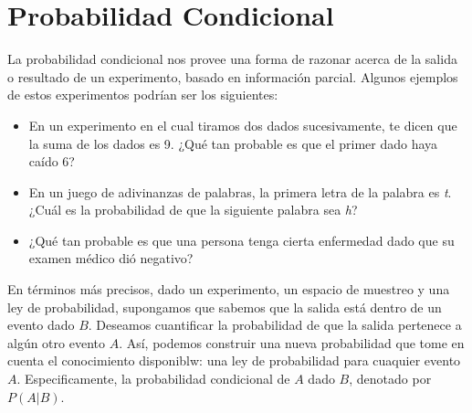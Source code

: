 
\section{Probabilidad Condicional}

La probabilidad condicional nos provee una forma de razonar acerca de la salida
o resultado de un experimento, basado en información parcial. Algunos ejemplos
de estos experimentos podrían ser los siguientes:

\begin{itemize}
\item En un experimento en el cual tiramos dos dados sucesivamente, te dicen que
la suma de los dados es 9. ¿Qué tan probable es que el primer dado haya caído 6?

\item En un juego de adivinanzas de palabras, la primera letra de la palabra es
\textit{t}. ¿Cuál es la probabilidad de que la siguiente palabra sea \textit{h}?

\item ¿Qué  tan probable es que una persona tenga cierta enfermedad dado que su
examen médico dió negativo?
\end{itemize}

En términos más precisos, dado un experimento, un espacio de muestreo y una ley
de probabilidad, supongamos que sabemos que la salida está dentro de un evento
dado $B$. Deseamos cuantificar la probabilidad de que la salida pertenece a
algún otro evento $A$. Así, podemos construir una nueva probabilidad que tome en
cuenta el conocimiento disponiblw: una ley de probabilidad para cuaquier evento
$A$. Especificamente, la probabilidad condicional de $A$ dado $B$, denotado por
$P(A|B)$.
